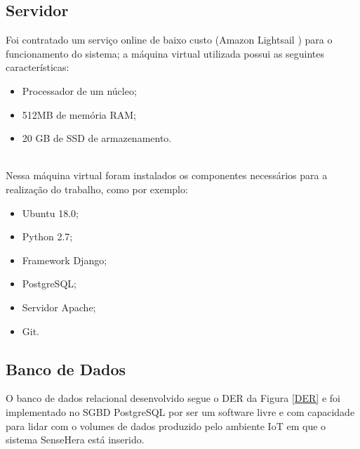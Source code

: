 \subsection{Servidor}
\nul \quad Foi contratado um serviço online de baixo custo (Amazon Lightsail \cite{lightsail}) para o funcionamento do sistema; a máquina virtual utilizada possui as seguintes características:
\begin{itemize}
  \item Processador de um núcleo;
  \item 512MB de memória RAM;
  \item 20 GB de SSD de armazenamento.
\end{itemize}
\\\null \quad Nessa máquina virtual foram instalados os componentes necessários para a realização do trabalho, como por exemplo:
\begin{itemize}
  \item Ubuntu 18.0;
  \item Python 2.7;
  \item Framework Django;
  \item PostgreSQL;
  \item Servidor Apache;
  \item Git.
\end{itemize}

\subsection{Banco de Dados}
\null \quad O banco de dados relacional desenvolvido segue o \acrfull{DER} da Figura \ref{DER} e foi implementado no \acrfull{SGBD} PostgreSQL por ser um software livre e com capacidade para lidar com o volumes de dados produzido pelo ambiente \acrshort{IoT} em que o sistema SenseHera está inserido.

\newpage
